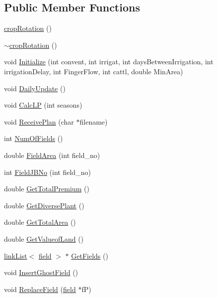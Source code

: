 \subsection*{Public Member Functions}
\begin{DoxyCompactItemize}
\item 
\hyperlink{classcrop_rotation_ae7b86becd93c7b2683959a9761544e26}{cropRotation} ()
\item 
\hyperlink{classcrop_rotation_a10e666b20669411f733598b1cb945a9a}{$\sim$cropRotation} ()
\item 
void \hyperlink{classcrop_rotation_ab81177f47739f25b3c8e398659eb4f5a}{Initialize} (int convent, int irrigat, int daysBetweenIrrigation, int irrigationDelay, int FingerFlow, int cattl, double MinArea)
\item 
void \hyperlink{classcrop_rotation_ab7b6db261a0972935ec1b84205495421}{DailyUpdate} ()
\item 
void \hyperlink{classcrop_rotation_ae3c3bc02c3b5c919ff640390297094f4}{CalcLP} (int seasons)
\item 
void \hyperlink{classcrop_rotation_a2789db66978b9330b357d5835d3b5b5e}{ReceivePlan} (char $\ast$filename)
\item 
int \hyperlink{classcrop_rotation_a4f700ca77df824f98c51144e4e00de2f}{NumOfFields} ()
\item 
double \hyperlink{classcrop_rotation_a8e06fe96e9ec89ad59170385960e026f}{FieldArea} (int field\_\-no)
\item 
int \hyperlink{classcrop_rotation_ae99cf520b3808fbcd2265743a8273e0e}{FieldJBNo} (int field\_\-no)
\item 
double \hyperlink{classcrop_rotation_ac947882c31389e5b1673829b4d7a47de}{GetTotalPremium} ()
\item 
double \hyperlink{classcrop_rotation_aed118395469c41fb634fc0d214b1a2ac}{GetDiversePlant} ()
\item 
double \hyperlink{classcrop_rotation_a9c59bb9848b03b283c1cca5bdad30a10}{GetTotalArea} ()
\item 
double \hyperlink{classcrop_rotation_a66d145fb7cd7bcf7e94298704b2702d7}{GetValueofLand} ()
\item 
\hyperlink{classlink_list}{linkList}$<$ \hyperlink{classfield}{field} $>$ $\ast$ \hyperlink{classcrop_rotation_ad85aaa3c1694c992e1a92fad544194b4}{GetFields} ()
\item 
void \hyperlink{classcrop_rotation_a84652568c0c22bd83cf89d4971666d52}{InsertGhostField} ()
\item 
void \hyperlink{classcrop_rotation_a231ad3ce0e69340a712d65159216e5d0}{ReplaceField} (\hyperlink{classfield}{field} $\ast$fP)

\end{DoxyCompactItemize}
